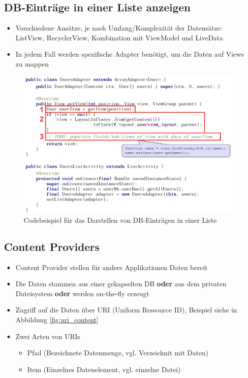 \documentclass[a4paper]{article}
\begin{document}
\newpage

\subsection{DB-Einträge in einer Liste anzeigen}

\begin{itemize}
	\item Verschiedene Ansätze, je nach Umfang/Komplexität der Datensätze:\\
	ListView, RecyclerView, Kombination mit ViewModel und LiveData
	\item In jedem Fall werden spezifische Adapter benötigt, um die Daten auf Views zu mappen
\end{itemize}

\begin{figure}[htb!]
	\centering
	\includegraphics[width=\textwidth]{img/dbentries_list.png}
	\caption{Codebeispiel für das Darstellen von DB-Einträgen in einer Liste}
\end{figure}

\newpage

\subsection{Content Providers}

\begin{itemize}
	\item Content Provider stellen für andere Applikationen Daten bereit
	\item Die Daten stammen aus einer gekapselten DB \textbf{oder} aus dem privaten Dateisystem \textbf{oder} werden on-the-fly erzeugt
	\item Zugriff auf die Daten über URI (Uniform Ressource ID), Beispiel siehe in Abbildung \ref{fig:uri_content}
	\item Zwei Arten von URIs
		\begin{itemize}
			\item Pfad (Bezeichnete Datenmenge, vgl. Verzeichnit mit Daten)
			\item Item (Einzelnes Datenelement, vgl. einzelne Datei)
		\end{itemize}
\end{itemize}
\end{document}
